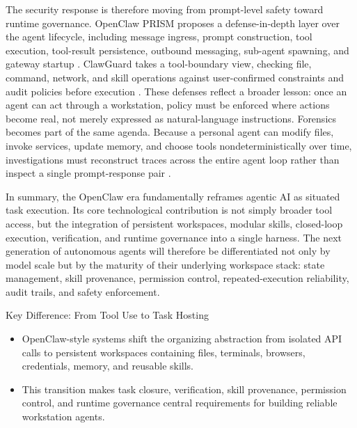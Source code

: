 The security response is therefore moving from prompt-level safety toward runtime governance.
OpenClaw PRISM proposes a defense-in-depth layer over the agent lifecycle, including message ingress, prompt construction, tool execution, tool-result persistence, outbound messaging, sub-agent spawning, and gateway startup \cite{li2026prism}.
ClawGuard takes a tool-boundary view, checking file, command, network, and skill operations against user-confirmed constraints and audit policies before execution \cite{zhao2026clawguard}.
These defenses reflect a broader lesson: once an agent can act through a workstation, policy must be enforced where actions become real, not merely expressed as natural-language instructions.
Forensics becomes part of the same agenda.
Because a personal agent can modify files, invoke services, update memory, and choose tools nondeterministically over time, investigations must reconstruct traces across the entire agent loop rather than inspect a single prompt-response pair \cite{gruber2026agenticforensics}.

In summary, the OpenClaw era fundamentally reframes agentic AI as situated task execution.
Its core technological contribution is not simply broader tool access, but the integration of persistent workspaces, modular skills, closed-loop execution, verification, and runtime governance into a single harness.
The next generation of autonomous agents will therefore be differentiated not only by model scale but by the maturity of their underlying workspace stack: state management, skill provenance, permission control, repeated-execution reliability, audit trails, and safety enforcement.

\begin{AIbox}{Key Difference: From Tool Use to Task Hosting}
    \begin{itemize}[left=2pt,topsep=1pt,itemsep=2pt, parsep=1pt]
        \item OpenClaw-style systems shift the organizing abstraction from isolated API calls to persistent workspaces containing files, terminals, browsers, credentials, memory, and reusable skills.

        \item This transition makes task closure, verification, skill provenance, permission control, and runtime governance central requirements for building reliable workstation agents.
    \end{itemize}
\end{AIbox}
